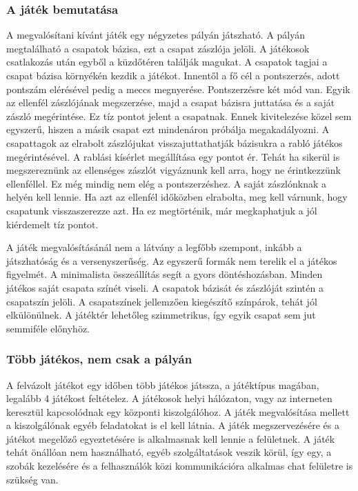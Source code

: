 \documentclass[]{article}
\begin{document}
\hypertarget{a-juxe1tuxe9k-bemutatuxe1sa}{%
\subsubsection{A játék bemutatása}\label{a-juxe1tuxe9k-bemutatuxe1sa}}

A megvalósítani kívánt játék egy négyzetes pályán játszható. A pályán
megtalálható a csapatok bázisa, ezt a csapat zászlója jelöli. A
játékosok csatlakozás után egyből a küzdőtéren találják magukat. A
csapatok tagjai a csapat bázisa környékén kezdik a játékot. Innentől a
fő cél a pontszerzés, adott pontszám elérésével pedig a meccs
megnyerése. Pontszerzésre két mód van. Egyik az ellenfél zászlójának
megszerzése, majd a csapat bázisra juttatása és a saját zászló
megérintése. Ez tíz pontot jelent a csapatnak. Ennek kivitelezése közel
sem egyszerű, hiszen a másik csapat ezt mindenáron próbálja
megakadályozni. A csapattagok az elrabolt zászlójukat visszajuttathatják
bázisukra a rabló játékos megérintésével. A rablási kísérlet megállítása
egy pontot ér. Tehát ha sikerül is megszereznünk az ellenséges zászlót
vigyáznunk kell arra, hogy ne érintkezzünk ellenféllel. Ez még mindig
nem elég a pontszerzéshez. A saját zászlónknak a helyén kell lennie. Ha
azt az ellenfél időközben elrabolta, meg kell várnunk, hogy csapatunk
visszaszerezze azt. Ha ez megtörténik, már megkaphatjuk a jól kiérdemelt
tíz pontot.

A játék megvalósításánál nem a látvány a legfőbb szempont, inkább a
játszhatóság és a versenyszerűség. Az egyszerű formák nem terelik el a
játékos figyelmét. A minimalista összeállítás segít a gyors
döntéshozásban. Minden játékos saját csapata színét viseli. A csapatok
bázisát és zászlóját szintén a csapatszín jelöli. A csapatszínek
jellemzően kiegészítő színpárok, tehát jól elkülönülnek. A játéktér
lehetőleg szimmetrikus, így egyik csapat sem jut semmiféle előnyhöz.

\hypertarget{tuxf6bb-juxe1tuxe9kos-nem-csak-a-puxe1lyuxe1n}{%
\subsubsection{Több játékos, nem csak a
pályán}\label{tuxf6bb-juxe1tuxe9kos-nem-csak-a-puxe1lyuxe1n}}

A felvázolt játékot egy időben több játékos játssza, a játéktípus
magában, legalább 4 játékost feltételez. A játékosok helyi hálózaton,
vagy az interneten keresztül kapcsolódnak egy központi kiszolgálóhoz. A
játék megvalósítása mellett a kiszolgálónak egyéb feladatokat is el kell
látnia. A játék megszervezésére és a játékot megelőző egyeztetésére is
alkalmasnak kell lennie a felületnek. A játék tehát önállóan nem
használható, egyéb szolgáltatások veszik körül, így egy, a szobák
kezelésére és a felhasználók közi kommunikációra alkalmas chat felületre
is szükség van.
\end{document}
